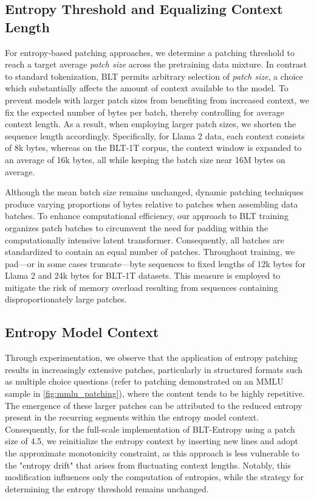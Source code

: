 \subsection{Entropy Threshold and Equalizing Context Length} For entropy-based patching approaches, we determine a patching threshold to reach a target average \textit{patch size} across the pretraining data mixture. In contrast to standard tokenization, {\textsc BLT} permits arbitrary selection of \textit{patch size}, a choice which substantially affects the amount of context available to the model. To prevent models with larger patch sizes from benefiting from increased context, we fix the expected number of bytes per batch, thereby controlling for average context length. As a result, when employing larger patch sizes, we shorten the sequence length accordingly. Specifically, for Llama 2 data, each context consists of 8k bytes, whereas on the {\textsc BLT}-1T corpus, the context window is expanded to an average of 16k bytes, all while keeping the batch size near 16M bytes on average.

Although the mean batch size remains unchanged, dynamic patching techniques produce varying proportions of bytes relative to patches when assembling data batches. To enhance computational efficiency, our approach to {\textsc BLT} training organizes patch batches to circumvent the need for padding within the computationally intensive latent transformer. Consequently, all batches are standardized to contain an equal number of patches. Throughout training, we pad—or in some cases truncate—byte sequences to fixed lengths of 12k bytes for Llama 2 and 24k bytes for {\textsc BLT}-1T datasets. This measure is employed to mitigate the risk of memory overload resulting from sequences containing disproportionately large patches.

\subsection{Entropy Model Context}
\label{section:entropy-context}
Through experimentation, we observe that the application of entropy patching results in increasingly extensive patches, particularly in structured formats such as multiple choice questions (refer to patching demonstrated on an MMLU sample in \autoref{fig:mmlu_patching}), where the content tends to be highly repetitive. The emergence of these larger patches can be attributed to the reduced entropy present in the recurring segments within the entropy model context. Consequently, for the full-scale implementation of {\textsc BLT}-Entropy using a patch size of 4.5, we reinitialize the entropy context by inserting new lines and adopt the approximate monotonicity constraint, as this approach is less vulnerable to the "entropy drift" that arises from fluctuating context lengths. Notably, this modification influences only the computation of entropies, while the strategy for determining the entropy threshold remains unchanged.

